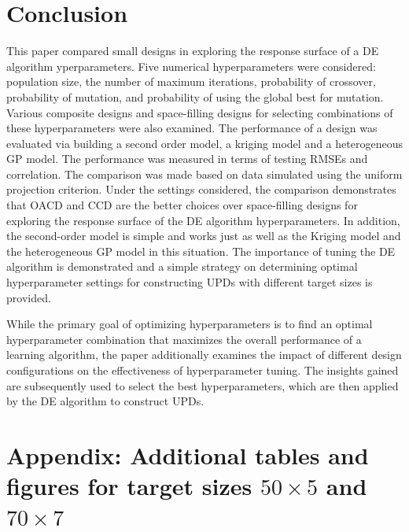 \documentclass [PhD] {package/uclathes}
\begin{document}
\section{Conclusion}
This paper compared small designs in exploring the response surface of a DE algorithm yperparameters. Five numerical hyperparameters were considered:  population size, the number of maximum iterations, probability of crossover, probability of mutation, and probability of using the global best for mutation. Various composite designs and space-filling designs for selecting combinations of these hyperparameters were also examined. The performance of a design was evaluated via building a second order model, a kriging model and a heterogeneous GP model. The performance was measured in terms of testing RMSEs and correlation. The comparison was made based on data simulated using the uniform projection criterion. Under the settings considered, the comparison demonstrates that OACD and CCD are the better choices over space-filling designs for exploring the response surface of the DE algorithm hyperparameters. In addition, the second-order model is simple and works just as well as the Kriging model and the heterogeneous GP model in this situation. The importance of tuning the DE algorithm is demonstrated and a simple strategy on determining optimal hyperparameter settings for  constructing UPDs with different target sizes is provided.

While the primary goal of optimizing hyperparameters is to find an optimal hyperparameter combination that maximizes the overall performance of a learning algorithm, the paper additionally examines the impact of different design configurations on the effectiveness of hyperparameter tuning. The insights gained are subsequently used to select the best hyperparameters, which are then applied by the DE algorithm to construct UPDs.

\clearpage
\section*{Appendix: Additional tables and figures for target sizes $50\times5$ and $70\times7$}
\end{document}
